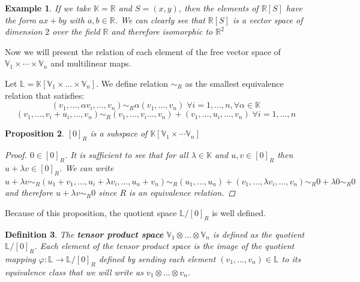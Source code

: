 \documentclass[11pt,a4paper,openright,oneside]{book}
\numberwithin{equation}{section}
\newtheorem{defn0}{Definition}[chapter]
\newtheorem{prop0}[defn0]{Proposition}
\newtheorem{example0}[defn0]{Example}
\newenvironment{definition}{ \begin{defn0}}{\end{defn0}}
\newenvironment{proposition}{\bigskip \begin{prop0}}{\end{prop0}}
\newenvironment{example}{ \begin{example0}\rm}{\end{example0}}
\begin{document}
\begin{example} If we take $\mathbb{K} = \mathbb{R}$ and $S = (x,y)$, then the elements of $\mathbb{R}[S]$ have the form $ax + by$ with $a, b \in \mathbb{R}$.
We can clearly see  that $\mathbb{R}[S]$ is a vector space of dimension $2$ over the field $\mathbb{R}$ and therefore
isomorphic to $\mathbb{R}^2$
\end{example}

Now we will present the relation of each element of the free vector space of $\mathbb{V}_1 \times \cdots \times \mathbb{V}_n$ and
multilinear maps.

Let $\mathbb{L} = \mathbb{K}[\mathbb{V}_1 \times \dots \times \mathbb{V}_n]$.
    We define relation $\sim_R$ as the smallest equivalence relation that satisfies: 
    $$(v_1, \dots, \alpha v_i, \dots, v_n) \sim_R \alpha(v_1, \dots, v_n) \; \forall i = 1, \dots, n, \forall \alpha \in \mathbb{K}$$
    $$(v_1, \dots, v_i + u_i, \dots, v_n) \sim_R (v_1, \dots, v_i \dots, v_n) + (v_1, \dots, u_i, \dots, v_n) \; \forall i = 1, \dots, n$$

\begin{proposition}
    $[0]_R$ is a subspace of $\mathbb{K} \left[ \mathbb{V}_1 \times \cdots \mathbb{V}_n \right]$

    \begin{proof}
        $0 \in [0]_R$. It is sufficient to see that for all $\lambda \in \mathbb{K}$ and $u, v \in [0]_R$ then $u + \lambda v \in [0]_R$.
        We can write $u + \lambda v \sim_R (u_1 + v_1, \dots, u_i + \lambda v_i, \dots, u_n + v_n) \sim_R 
        (u_1, \dots, u_n) + (v_1, \dots, \lambda v_i, \dots, v_n) \sim_R 0 + \lambda 0 \sim_R 0$ and therefore
        $u + \lambda v \sim_R 0$ since $R$ is an equivalence relation.
    \end{proof}
\end{proposition}

Because of this proposition, the quotient space $\mathbb{L} / [0]_R$ is well defined.

\begin{definition} 
    The \textbf{tensor product space} $\mathbb{V}_1 \otimes \dots \otimes \mathbb{V}_n$ is defined as the quotient $\mathbb{L} / [0]_R$. 
    Each element of the tensor product space is the image of the quotient mapping ${\varphi: \mathbb{L} \rightarrow \mathbb{L} / [0]_R}$
    defined by sending each element $(v_1, \dots, v_n) \in \mathbb{L}$ to its equivalence class that we
    will write as $v_1 \otimes \dots \otimes v_n$. 
\end{definition}
\end{document}
